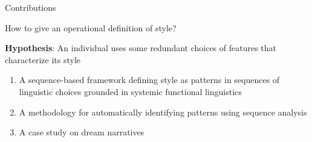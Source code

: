 \documentclass[handout,10pt]{beamer}
\begin{document}
\begin{frame}{Contributions}

How to give an operational definition of style?

\vspace{0.25cm}
\pause

\textbf{Hypothesis}: An individual uses some redundant choices of features that characterize its style

\vspace{0.25cm}
\pause



\begin{enumerate}[<+->]
    \item A sequence-based framework defining style as patterns in sequences of linguistic choices grounded in systemic functional linguistics
    \item A methodology for automatically identifying patterns using sequence analysis
    \item A case study on dream narratives %
\end{enumerate}
    
\end{frame}
\end{document}
